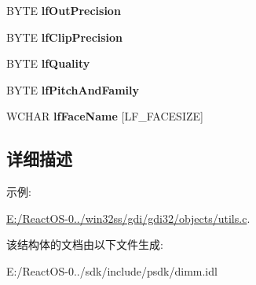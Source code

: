 \begin{DoxyCompactItemize}
\mbox{\label{struct_l_o_g_f_o_n_t_w_a4600a2ba2f88747c6364a641a48e069a}} 
B\+Y\+TE {\bfseries lf\+Out\+Precision}
\item 
\mbox{\label{struct_l_o_g_f_o_n_t_w_abb4510d250d8e5268dccbed16faccdc5}} 
B\+Y\+TE {\bfseries lf\+Clip\+Precision}
\item 
\mbox{\label{struct_l_o_g_f_o_n_t_w_af2b34578f9cd4c0a32506786fcaf51dd}} 
B\+Y\+TE {\bfseries lf\+Quality}
\item 
\mbox{\label{struct_l_o_g_f_o_n_t_w_af589e1ec68cdfbe0f525982335c55cf6}} 
B\+Y\+TE {\bfseries lf\+Pitch\+And\+Family}
\item 
\mbox{\label{struct_l_o_g_f_o_n_t_w_a898242d19c52887d7ff01eb29958d8e0}} 
W\+C\+H\+AR {\bfseries lf\+Face\+Name} \mbox{[}L\+F\+\_\+\+F\+A\+C\+E\+S\+I\+ZE\mbox{]}
\end{DoxyCompactItemize}


\subsection{详细描述}
\begin{Desc}
\item[示例\+: ]\par
\hyperlink{_e_1_2_react_o_s-0_84_86_2win32ss_2gdi_2gdi32_2objects_2utils_8c-example}{E\+:/\+React\+O\+S-\/0../win32ss/gdi/gdi32/objects/utils.\+c}.\end{Desc}


该结构体的文档由以下文件生成\+:\begin{DoxyCompactItemize}
\item 
E\+:/\+React\+O\+S-\/0../sdk/include/psdk/dimm.\+idl\end{DoxyCompactItemize}
